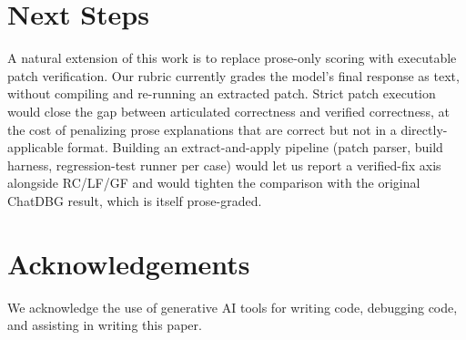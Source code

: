 \documentclass[11pt]{article}
\begin{document}
\section*{Next Steps}

A natural extension of this work is to replace prose-only scoring with executable patch verification. Our rubric currently grades the model's final response as text, without compiling and re-running an extracted patch. Strict patch execution would close the gap between articulated correctness and verified correctness, at the cost of penalizing prose explanations that are correct but not in a directly-applicable format. Building an extract-and-apply pipeline (patch parser, build harness, regression-test runner per case) would let us report a verified-fix axis alongside RC/LF/GF and would tighten the comparison with the original ChatDBG result, which is itself prose-graded.

\section*{Acknowledgements}
We acknowledge the use of generative AI tools for writing code, debugging code, and assisting in writing this paper. 



\end{document}
